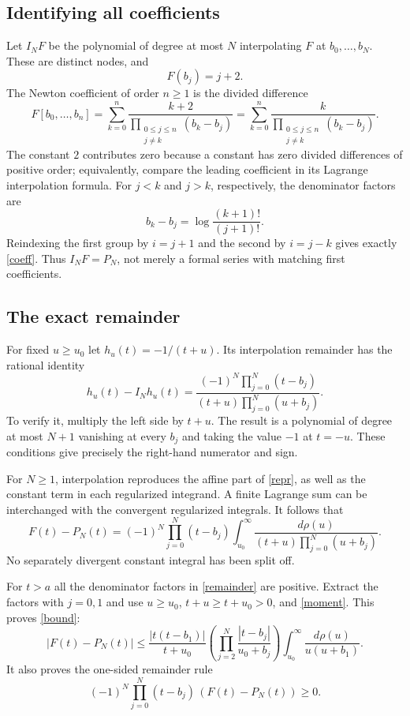 \documentclass[11pt]{article}
\begin{document}
\subsection*{Identifying all coefficients}
Let $I_NF$ be the polynomial of degree at most $N$ interpolating
$F$ at $b_0,\ldots,b_N$. These are distinct nodes, and
\[
 F(b_j)=j+2.
\]
The Newton coefficient of order $n\geq1$ is the divided difference
\[
 F[b_0,\ldots,b_n]
   =\sum_{k=0}^n\frac{k+2}{\prod_{\substack{0\leq j\leq n\\j\ne k}}(b_k-b_j)}
   =\sum_{k=0}^n\frac{k}{\prod_{\substack{0\leq j\leq n\\j\ne k}}(b_k-b_j)}.
\]
The constant $2$ contributes zero because a constant has zero
divided differences of positive order; equivalently, compare the
leading coefficient in its Lagrange interpolation formula.
For $j<k$ and $j>k$, respectively, the denominator factors are
\[
 b_k-b_j=\log\frac{(k+1)!}{(j+1)!}.
\]
Reindexing the first group by $i=j+1$ and the second by $i=j-k$
gives exactly \eqref{coeff}. Thus $I_NF=P_N$, not merely a formal
series with matching first coefficients.

\subsection*{The exact remainder}
For fixed $u\geq u_0$ let $h_u(t)=-1/(t+u)$. Its interpolation
remainder has the rational identity
\begin{equation}\label{kernel}
 h_u(t)-I_Nh_u(t)
   =\frac{(-1)^N\prod_{j=0}^N(t-b_j)}
          {(t+u)\prod_{j=0}^N(u+b_j)}.
\end{equation}
To verify it, multiply the left side by $t+u$.
The result is a polynomial of degree at most $N+1$ vanishing at
every $b_j$ and taking the value $-1$ at $t=-u$.
These conditions give precisely the right-hand numerator and sign.

For $N\geq1$, interpolation reproduces the affine part of
\eqref{repr}, as well as the constant term in each regularized
integrand. A finite Lagrange sum can be interchanged with the
convergent regularized integrals. It follows that
\begin{equation}\label{remainder}
 F(t)-P_N(t)=(-1)^N\prod_{j=0}^N(t-b_j)
       \int_{u_0}^\infty
       \frac{d\rho(u)}{(t+u)\prod_{j=0}^N(u+b_j)}.
\end{equation}
No separately divergent constant integral has been split off.

For $t>a$ all the denominator factors in \eqref{remainder}
are positive. Extract the factors with $j=0,1$ and use
$u\geq u_0$, $t+u\geq t+u_0>0$, and \eqref{moment}.
This proves \eqref{bound}:
\[
 |F(t)-P_N(t)|
 \leq
 \frac{|t(t-b_1)|}{t+u_0}
 \left(\prod_{j=2}^N\frac{|t-b_j|}{u_0+b_j}\right)
 \int_{u_0}^\infty\frac{d\rho(u)}{u(u+b_1)}.
\]
It also proves the one-sided remainder rule
\begin{equation}\label{signerror}
 (-1)^N\prod_{j=0}^N(t-b_j)\,
       (F(t)-P_N(t))\geq0.
\end{equation}
\end{document}

